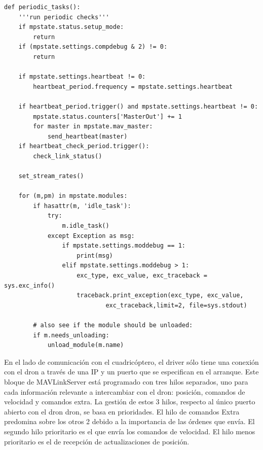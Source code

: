 \begin{lstlisting}[frame=single]
def periodic_tasks():
    '''run periodic checks'''
    if mpstate.status.setup_mode:
        return
    if (mpstate.settings.compdebug & 2) != 0:
        return

    if mpstate.settings.heartbeat != 0:
        heartbeat_period.frequency = mpstate.settings.heartbeat

    if heartbeat_period.trigger() and mpstate.settings.heartbeat != 0:
        mpstate.status.counters['MasterOut'] += 1
        for master in mpstate.mav_master:
            send_heartbeat(master)
    if heartbeat_check_period.trigger():
        check_link_status()

    set_stream_rates()

    for (m,pm) in mpstate.modules:
        if hasattr(m, 'idle_task'):
            try:
                m.idle_task()
            except Exception as msg:
                if mpstate.settings.moddebug == 1:
                    print(msg)
                elif mpstate.settings.moddebug > 1:
                    exc_type, exc_value, exc_traceback = sys.exc_info()
                    traceback.print_exception(exc_type, exc_value, 
                    		exc_traceback,limit=2, file=sys.stdout)

        # also see if the module should be unloaded:
        if m.needs_unloading:
            unload_module(m.name)
\end{lstlisting}

En el lado de comunicación con el cuadricóptero, el driver sólo tiene una conexión con el dron a través de una IP y un puerto que se especifican en el arranque. Este bloque de MAVLinkServer está programado con tres hilos separados, uno para cada información relevante a intercambiar con el dron: posición, comandos de velocidad y comandos extra. La gestión de estos 3 hilos, respecto al único puerto abierto con el dron dron, se basa en prioridades. El hilo de comandos Extra predomina sobre los otros 2 debido a la importancia de las órdenes que envía. El segundo hilo prioritario es el que envía los comandos de velocidad. El hilo menos prioritario es el de recepción de actualizaciones de posición. 

